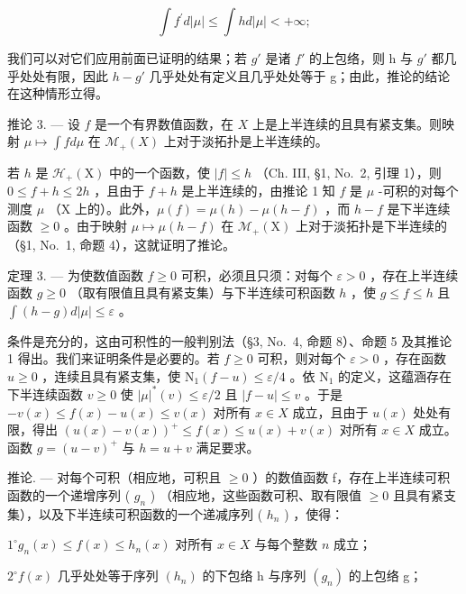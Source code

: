 \[
\int f ^ {\prime} d | \mu | \leqslant \int h d | \mu | <   + \infty ;
\]

我们可以对它们应用前面已证明的结果；若 \(g'\) 是诸 \(f'\) 的上包络，则 h 与 \(g'\) 都几乎处处有限，因此 \(h - g'\) 几乎处处有定义且几乎处处等于 g；由此，推论的结论在这种情形立得。

推论 3. --- 设 \(f\) 是一个有界数值函数，在 \(X\) 上是上半连续的且具有紧支集。则映射 \(\mu \mapsto \int f d\mu\) 在 \(\mathcal{M}_{+}(X)\) 上对于淡拓扑是上半连续的。

若 \(h\) 是 \(\mathcal{H}_{+}(\mathrm{X})\) 中的一个函数，使 \(|f| \leqslant h\) （Ch. III, §1, No.~2, 引理 1），则 \(0 \leqslant f + h \leqslant 2h\) ，且由于 \(f + h\) 是上半连续的，由推论 1 知 \(f\) 是 \(\mu\) -可积的对每个测度 \(\mu\) （\(\mathrm{X}\) 上的）。此外，\(\mu(f) = \mu(h) - \mu(h - f)\) ，而 \(h - f\) 是下半连续函数 \(\geqslant 0\) 。由于映射 \(\mu \mapsto \mu(h - f)\) 在 \(\mathcal{M}_{+}(\mathrm{X})\) 上对于淡拓扑是下半连续的（§1, No.~1, 命题 4），这就证明了推论。

定理 3. --- 为使数值函数 \(f \geqslant 0\) 可积，必须且只须：对每个 \(\varepsilon > 0\) ，存在上半连续函数 \(g \geqslant 0\) （取有限值且具有紧支集）与下半连续可积函数 \(h\) ，使 \(g \leqslant f \leqslant h\) 且 \(\int (h - g) d|\mu| \leqslant \varepsilon\) 。

条件是充分的，这由可积性的一般判别法（§3, No.~4, 命题 8）、命题 5 及其推论 1 得出。我们来证明条件是必要的。若 \(f \geqslant 0\) 可积，则对每个 \(\varepsilon > 0\) ，存在函数 \(u \geqslant 0\) ，连续且具有紧支集，使 \(\mathrm{N}_1(f - u) \leqslant \varepsilon / 4\) 。依 \(\mathrm{N}_1\) 的定义，这蕴涵存在下半连续函数 \(v \geqslant 0\) 使 \(|\mu|^*(v) \leqslant \varepsilon / 2\) 且 \(|f - u| \leqslant v\) 。于是 \(-v(x) \leqslant f(x) - u(x) \leqslant v(x)\) 对所有 \(x \in X\) 成立，且由于 \(u(x)\) 处处有限，得出 \((u(x) - v(x))^+ \leqslant f(x) \leqslant u(x) + v(x)\) 对所有 \(x \in X\) 成立。函数 \(g = (u - v)^+\) 与 \(h = u + v\) 满足要求。

推论. --- 对每个可积（相应地，可积且 \(\geqslant0\) ）的数值函数 f，存在上半连续可积函数的一个递增序列 ( \(g_{n}\) ) （相应地，这些函数可积、取有限值 \(\geqslant0\) 且具有紧支集），以及下半连续可积函数的一个递减序列 ( \(h_{n}\) ) ，使得：

\(1^{\circ} g_{n}(x) \leqslant f(x) \leqslant h_{n}(x)\) 对所有 \(x \in X\) 与每个整数 \(n\) 成立；

\(2^{\circ} f(x)\) 几乎处处等于序列 \((h_{n})\) 的下包络 h 与序列 \((g_{n})\) 的上包络 g；

